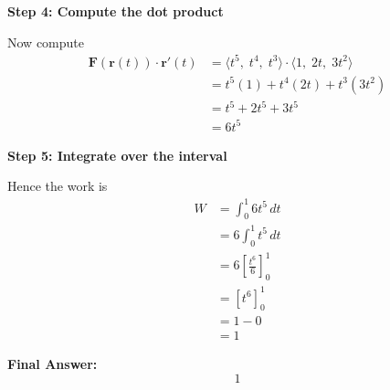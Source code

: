 \begin{examplebox}
    \textbf{Step 4: Compute the dot product}

    Now compute
    \begin{align*}
        \mathbf{F}(\mathbf{r}(t))\cdot \mathbf{r}'(t)
         & = \langle t^5,\; t^4,\; t^3 \rangle \cdot \langle 1,\; 2t,\; 3t^2 \rangle \\
         & = t^5(1) + t^4(2t) + t^3(3t^2)                                            \\
         & = t^5 + 2t^5 + 3t^5                                                       \\
         & = 6t^5
    \end{align*}

    \textbf{Step 5: Integrate over the interval}

    Hence the work is
    \begin{align*}
        W
         & = \int_0^1 6t^5\,dt               \\
         & = 6\int_0^1 t^5\,dt               \\
         & = 6\left[\frac{t^6}{6}\right]_0^1 \\
         & = \left[t^6\right]_0^1            \\
         & = 1-0                             \\
         & = 1
    \end{align*}

    \textbf{Final Answer:}
    \begin{equation*}
        \boxed{1}
    \end{equation*}
\end{examplebox}
